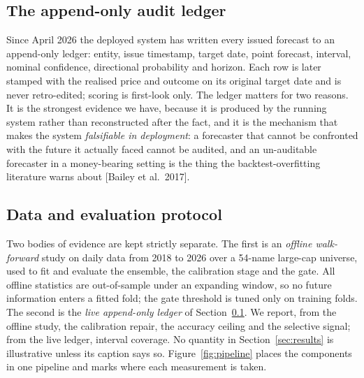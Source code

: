 \documentclass[10pt,a4paper,oneside]{article}
\theoremstyle{definition}
\theoremstyle{plain}
\begin{document}
\subsection{The append-only audit ledger}
\label{sec:ledger}
Since April 2026 the deployed system has written every issued forecast to an
append-only ledger: entity, issue timestamp, target date, point forecast, interval,
nominal confidence, directional probability and horizon. Each row is later stamped
with the realised price and outcome on its original target date and is never
retro-edited; scoring is first-look only. The ledger matters for two reasons. It is
the strongest evidence we have, because it is produced by the running system rather
than reconstructed after the fact, and it is the mechanism that makes the system
\emph{falsifiable in deployment}: a forecaster that cannot be confronted with the
future it actually faced cannot be audited, and an un-auditable forecaster in a
money-bearing setting is the thing the backtest-overfitting literature warns about
[Bailey et al.\ 2017].

\subsection{Data and evaluation protocol}
\label{sec:data}
Two bodies of evidence are kept strictly separate. The first is an \emph{offline
walk-forward} study on daily data from 2018 to 2026 over a 54-name large-cap universe,
used to fit and evaluate the ensemble, the calibration stage and the gate. All offline
statistics are out-of-sample under an expanding window, so no future information enters
a fitted fold; the gate threshold is tuned only on training folds. The second is the
\emph{live append-only ledger} of Section~\ref{sec:ledger}. We report, from the
offline study, the calibration repair, the accuracy ceiling and the selective signal;
from the live ledger, interval coverage. No quantity in Section~\ref{sec:results} is
illustrative unless its caption says so. Figure~\ref{fig:pipeline} places the
components in one pipeline and marks where each measurement is taken.
\end{document}
